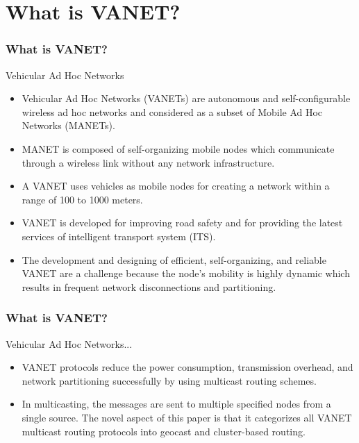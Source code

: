 \documentclass{beamer}
\begin{document}
\section{What is VANET?}

\begin{frame}
	\frametitle{What is VANET?}
	\begin{block}{Vehicular Ad Hoc Networks}
		\begin{itemize}
			\item Vehicular Ad Hoc Networks (VANETs) are autonomous and self-configurable wireless ad hoc networks and considered as a subset of Mobile Ad Hoc Networks (MANETs).\\
			\item MANET is composed of self-organizing mobile nodes which communicate through a wireless link without any network infrastructure.\\
		    \item A VANET uses vehicles as mobile nodes for creating a network within a range of 100 to 1000 meters. \\
			\item VANET is developed for improving road safety and for providing the latest services of intelligent transport system (ITS).\\
			\item The development and designing of efficient, self-organizing, and reliable VANET are a challenge because the node’s mobility is highly dynamic which results in frequent network disconnections and partitioning.\\ 
			
			
		\end{itemize}
	\end{block}
	
\end{frame}

\begin{frame}
	\frametitle{What is VANET?}
	\begin{block}{Vehicular Ad Hoc Networks...}
		\begin{itemize}
			\item VANET protocols reduce the power consumption, transmission overhead, and network partitioning successfully by using multicast routing schemes.\\ 
			\item In multicasting, the messages are sent to multiple specified nodes from a single source. The novel aspect of this paper is that it categorizes all VANET multicast routing protocols into geocast and cluster-based routing.
		\end{itemize}
	\end{block}
	
\end{frame}
 
\end{document}
